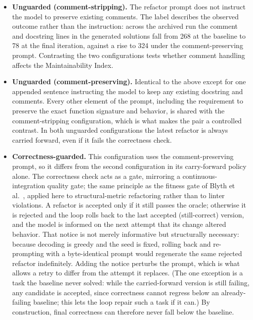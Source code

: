 \begin{itemize}
  \item \textbf{Unguarded (comment-stripping).} The refactor prompt does not
    instruct the model to preserve existing comments. The label describes the
    observed outcome rather than the instruction: across the archived run the
    comment and docstring lines in the generated solutions fall from 268 at the
    baseline to 78 at the final iteration, against a rise to 324 under the
    comment-preserving prompt. Contrasting the two configurations tests whether
    comment handling affects the Maintainability Index.
  \item \textbf{Unguarded (comment-preserving).} Identical to the above except for
    one appended sentence instructing the model to keep any existing docstring and
    comments. Every other element of the prompt, including the requirement to preserve the
    exact function signature and behavior, is shared with the
    comment-stripping configuration, which is what makes the pair a controlled
    contrast. In both unguarded configurations the latest refactor is always
    carried forward, even if it fails the correctness check.
  \item \textbf{Correctness-guarded.} This configuration uses the
    comment-preserving prompt, so it differs from the second configuration in its
    carry-forward policy alone. The correctness check acts as a gate,
    mirroring a continuous-integration quality gate; the same principle as the
    fitness gate of Blyth et al.~\citep{blyth2025scam}, applied here to
    structural-metric refactoring rather than to linter
    violations. A refactor is accepted only
    if it still passes the oracle; otherwise it is rejected and the loop rolls
    back to the last accepted (still-correct) version, and the model is informed
    on the next attempt that its change altered behavior. That notice is not
    merely informative but structurally necessary: because decoding is greedy and
    the seed is fixed, rolling back and re-prompting with a byte-identical prompt
    would regenerate the same rejected refactor indefinitely. Adding the notice
    perturbs the prompt, which is what allows a retry to differ from the attempt it
    replaces. (The one exception is a
    task the baseline never solved: while the carried-forward version is still
    failing, any candidate is accepted, since correctness cannot regress below an already-failing baseline; this lets the loop repair such a task if it
    can.)
    By construction, final correctness can therefore never fall below the baseline.
\end{itemize}

